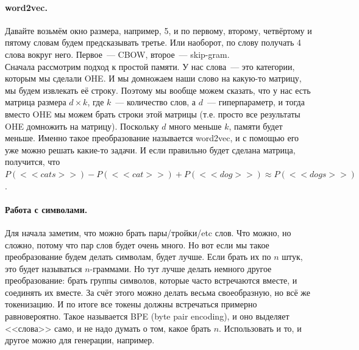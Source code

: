\documentclass{article}
\begin{document}
    \paragraph{word2vec.}
    Давайте возьмём окно размера, например, 5, и по первому, второму, четвёртому и пятому словам будем предсказывать третье. Или наоборот, по слову получать 4 слова вокруг него. Первое~--- CBOW, второе~--- skip-gram.\\
    Сначала рассмотрим подход к простой памяти. У нас слова~--- это категории, которым мы сделали OHE. И мы домножаем наши слово на какую-то матрицу, мы будем извлекать её строку. Поэтому мы вообще можем сказать, что у нас есть матрица размера $d\times k$, где $k$~--- количество слов, а $d$~--- гиперпараметр, и тогда вместо OHE мы можем брать строки этой матрицы (т.е. просто все результаты OHE домножить на матрицу). Поскольку $d$ много меньше $k$, памяти будет меньше. Именно такое преобразование называется word2vec, и с помощью его уже можно решать какие-то задачи. И если правильно будет сделана матрица, получится, что $P(<<cats>>)-P(<<cat>>)+P(<<dog>>)\approx P(<<dogs>>)$.
    \paragraph{Работа с символами.}
    Для начала заметим, что можно брать пары/тройки/etc слов. Что можно, но сложно, потому что пар слов будет очень много. Но вот если мы такое преобразование будем делать символам, будет лучше. Если брать их по $n$ штук, это будет называться $n$-граммами. Но тут лучше делать немного другое преобразование: брать группы символов, которые часто встречаются вместе, и соединять их вместе. За счёт этого можно делать весьма своеобразную, но всё же токенизацию. И по итоге все токены должны встречаться примерно равновероятно. Такое называется BPE (byte pair encoding), и оно выделяет <<слова>> само, и не надо думать о том, какое брать $n$. Использовать и то, и другое можно для генерации, например.
\end{document}
